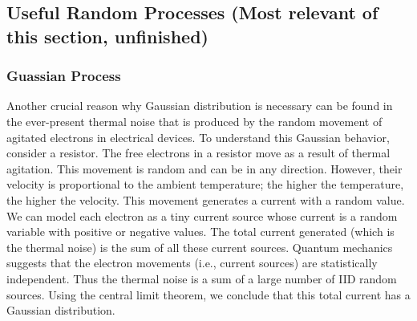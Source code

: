 \documentclass{article}
\begin{document}
\subsection{Useful Random Processes (Most relevant of this section, unfinished)}
\subsubsection{Guassian Process}
Another
crucial reason why Gaussian distribution is necessary can be found in the
ever-present thermal noise that is produced by the random movement of
agitated electrons in electrical devices. To understand this Gaussian behavior, consider a resistor. The free
electrons in a resistor move as a result of thermal agitation. This movement is random and can be in any direction. However, their velocity is
proportional to the ambient temperature; the higher the temperature,
the higher the velocity. This movement generates a current with a random value. We can model each electron as a tiny current source whose
current is a random variable with positive or negative values. The total
current generated (which is the thermal noise) is the sum of all these current sources. Quantum mechanics suggests that the electron movements
(i.e., current sources) are statistically independent. Thus the thermal noise
is a sum of a large number of IID random sources. Using the central limit
theorem, we conclude that this total current has a Gaussian distribution.
\end{document}
